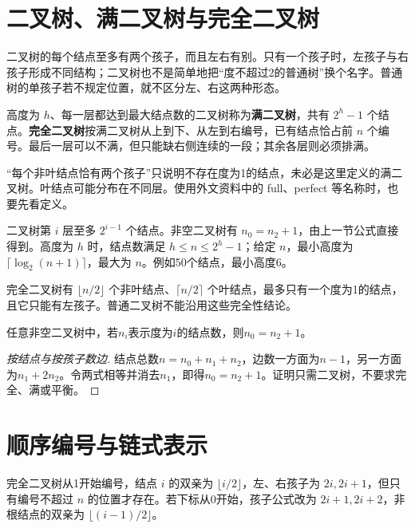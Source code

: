 \section{二叉树、满二叉树与完全二叉树}\label{DS05-02}

二叉树的每个结点至多有两个孩子，而且左右有别。只有一个孩子时，左孩子与右孩子形成不同结构；二叉树也不是简单地把``度不超过2的普通树''换个名字。普通树的单孩子若不规定位置，就不区分左、右这两种形态。

高度为 \(h\)、每一层都达到最大结点数的二叉树称为\textbf{满二叉树}，共有 \(2^h-1\) 个结点。\textbf{完全二叉树}按满二叉树从上到下、从左到右编号，已有结点恰占前 \(n\) 个编号。最后一层可以不满，但只能缺右侧连续的一段；其余各层则必须排满。

``每个非叶结点恰有两个孩子''只说明不存在度为1的结点，未必是这里定义的满二叉树。叶结点可能分布在不同层。使用外文资料中的 full、perfect 等名称时，也要先看定义。

二叉树第 \(i\) 层至多 \(2^{i-1}\) 个结点。非空二叉树有 \(n_0=n_2+1\)，由上一节公式直接得到。高度为 \(h\) 时，结点数满足 \(h\le n\le2^h-1\)；给定 \(n\)，最小高度为 \(\lceil\log_2(n+1)\rceil\)，最大为 \(n\)。例如50个结点，最小高度6。

完全二叉树有 \(\lfloor n/2\rfloor\) 个非叶结点、\(\lceil n/2\rceil\) 个叶结点，最多只有一个度为1的结点，且它只能有左孩子。普通二叉树不能沿用这些完全性结论。

\begin{theorem}[二叉树的叶与双孩子结点]

任意非空二叉树中，若\(n_i\)表示度为\(i\)的结点数，则\(n_0=n_2+1\)。

\end{theorem}

\begin{proof}[按结点与按孩子数边]

结点总数\(n=n_0+n_1+n_2\)，边数一方面为\(n-1\)，另一方面为\(n_1+2n_2\)。令两式相等并消去\(n_1\)，即得\(n_0=n_2+1\)。证明只需二叉树，不要求完全、满或平衡。

\end{proof}

\section{顺序编号与链式表示}\label{DS05-03}

完全二叉树从1开始编号，结点 \(i\) 的双亲为 \(\lfloor i/2\rfloor\)，左、右孩子为 \(2i,2i+1\)，但只有编号不超过 \(n\) 的位置才存在。若下标从0开始，孩子公式改为 \(2i+1,2i+2\)，非根结点的双亲为 \(\lfloor(i-1)/2\rfloor\)。

